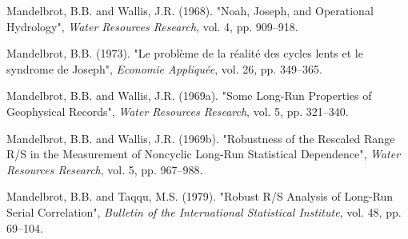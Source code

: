 \documentclass[11pt]{extarticle}
\begin{document}
Mandelbrot, B.B. and Wallis, J.R. (1968). "Noah, Joseph, and Operational Hydrology", \textit{Water Resources Research}, vol. 4, pp. 909--918.

Mandelbrot, B.B. (1973). "Le problème de la réalité des cycles lents et le syndrome de Joseph", \textit{Economie Appliquée}, vol. 26, pp. 349--365.

Mandelbrot, B.B. and Wallis, J.R. (1969a). "Some Long-Run Properties of Geophysical Records", \textit{Water Resources Research}, vol. 5, pp. 321--340.

Mandelbrot, B.B. and Wallis, J.R. (1969b). "Robustness of the Rescaled Range R/S in the Measurement of Noncyclic Long-Run Statistical Dependence", \textit{Water Resources Research}, vol. 5, pp. 967--988.

Mandelbrot, B.B. and Taqqu, M.S. (1979). "Robust R/S Analysis of Long-Run Serial Correlation", \textit{Bulletin of the International Statistical Institute}, vol. 48, pp. 69--104.
\end{document}
